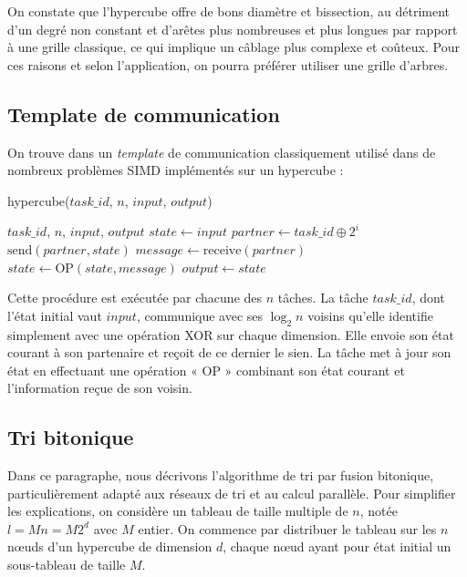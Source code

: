 On constate que l'hypercube offre de bons diamètre et bissection, au détriment d'un degré non constant et d'arêtes plus nombreuses et plus longues par rapport à une grille classique, ce qui implique un câblage plus complexe et coûteux. Pour ces raisons et selon l'application, on pourra préférer utiliser une grille d'arbres.

\subsection{Template de communication}

On trouve dans \cite{FOSTER} un \textit{template} de communication classiquement utilisé dans de nombreux problèmes SIMD implémentés sur un hypercube :

\begin{algorithm}
\caption{hypercube($task\_id$, $n$, $input$, $output$)}
\begin{algorithmic}
\REQUIRE $task\_id$, $n$, $input$, $output$
\STATE $state \leftarrow input$
\STATE $partner \leftarrow task\_id \oplus 2^i$
\STATE $\text{send}(partner, state)$
\STATE $message \leftarrow \text{receive}(partner)$
\STATE $state \leftarrow \text{OP}(state, message)$
\ENDFOR
\STATE $output \leftarrow state$
\end{algorithmic}
\end{algorithm}

Cette procédure est exécutée par chacune des $n$ tâches. La tâche $task\_id$, dont l'état initial vaut $input$, communique avec ses $\log_2 n$ voisins qu'elle identifie simplement avec une opération XOR sur chaque dimension. Elle envoie son état courant à son partenaire et reçoit de ce dernier le sien. La tâche met à jour son état en effectuant une opération « OP » combinant son état courant et l'information reçue de son voisin.

\subsection{Tri bitonique}

Dans ce paragraphe, nous décrivons l'algorithme de tri par fusion bitonique, particulièrement adapté aux réseaux de tri et au calcul parallèle. Pour simplifier les explications, on considère un tableau de taille multiple de $n$, notée $l = Mn = M2^d$ avec $M$ entier. On commence par distribuer le tableau sur les $n$ nœuds d'un hypercube de dimension $d$, chaque nœud ayant pour état initial un sous-tableau de taille $M$.

